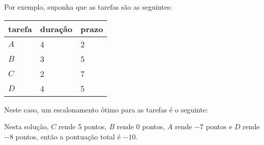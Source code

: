 Por exemplo, suponha que as tarefas são as seguintes:
\begin{center}
\begin{tabular}{lll}
tarefa & duração & prazo \\
\hline
$A$ & 4 & 2 \\
$B$ & 3 & 5 \\
$C$ & 2 & 7 \\
$D$ & 4 & 5 \\
\end{tabular}
\end{center}
Neste caso, um escalonamento ótimo para as tarefas
é o seguinte:
\begin{center}
\end{center}
Nesta solução, $C$ rende 5 pontos,
$B$ rende 0 pontos, $A$ rende $-7$ pontos
e $D$ rende $-8$ pontos,
então a pontuação total é $-10$.

